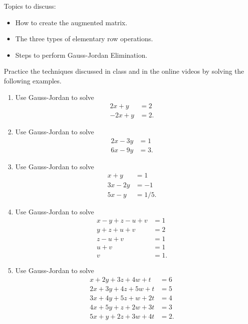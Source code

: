 \documentclass[10pt]{book}
\theoremstyle{definition}
\theoremstyle{remark}
\begin{document}
\begin{large}
\noindent
Topics to discuss:
\begin{itemize}
\item How to create the augmented matrix. 
\item The three types of elementary row operations. 
\item Steps to perform Gauss-Jordan Elimination.
\end{itemize}
\newpage

\noindent
Practice the techniques discussed in class and in the online videos by solving the following examples. 
\begin{enumerate}
\item Use Gauss-Jordan to solve \begin{align*}  2x + y &= 2\\ -2x + y &= 2. \end{align*}
\vfil \vfil \vfil

\item Use Gauss-Jordan to solve \begin{align*}  2x - 3y &= 1 \\ 6x - 9y &= 3. \end{align*}
\vfil \vfil \vfil

\item Use Gauss-Jordan to solve \begin{align*}  x + y &= 1\\ 3x - 2y &= -1\\ 5x - y &= 1/5. \end{align*}
\vfil \vfil \vfil
\newpage

\item Use Gauss-Jordan to solve \begin{align*}  x - y + z - u + v &= 1\\y + z + u + v &= 2 \\ z - u + v &= 1\\ u + v &= 1\\ v &= 1. \end{align*} \vfil\vfil

\newpage

\item Use Gauss-Jordan to solve \begin{align*} x + 2y + 3z + 4w + t &= 6\\ 2x + 3y + 4z + 5w + t &= 5\\ 3x + 4y + 5z + w + 2t &= 4\\4x+5y + z + 2w + 3t &=3\\ 5x + y + 2z + 3w + 4t &=2. \end{align*} \vfil \vfil
\newpage


\end{enumerate}
\end{large}
\end{document}
